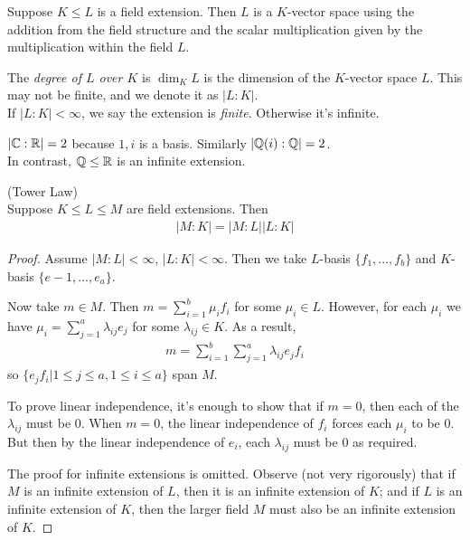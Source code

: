 \documentclass[a4paper]{article}
\begin{document}
Suppose $K \leq L$ is a field extension. Then $L$ is a $K$-vector space using the addition from the field structure and the scalar multiplication given by the multiplication within the field $L$.

\begin{defi}
The \emph{degree of $L$ over $K$} is $\dim_K L$ is the dimension of the $K$-vector space $L$. This may not be finite, and we denote it as $|L:K|$.\\
If $|L:K|<\infty$, we say the extension is \emph{finite}. Otherwise it's infinite.
\end{defi}

\begin{eg}
$|\mathbb{C}:\mathbb{R}| = 2$ because ${1,i}$ is a basis. Similarly $|\mathbb{Q}(i):\mathbb{Q}| = 2$.\\
In contrast, $\mathbb{Q}\leq\mathbb{R}$ is an infinite extension.
\end{eg}

\begin{thm} (Tower Law)\\
Suppose $K\leq L\leq M$ are field extensions. Then
\begin{equation*}
\begin{aligned}
|M:K| = |M:L| |L:K|
\end{aligned}
\end{equation*}
\begin{proof}
Assume $|M:L|<\infty$, $|L:K|<\infty$. Then we take $L$-basis $\{f_1,...,f_b\}$ and $K$-basis $\{e-1,...,e_a\}$.

Now take $m \in M$. Then $m= \sum_{i=1}^b \mu_i f_i$ for some $\mu_i \in L$. However, for each $\mu_i$ we have $\mu_i = \sum_{j=1}^a \lambda_{ij} e_j$ for some $\lambda_{ij} \in K$. As a result,
\begin{equation*}
\begin{aligned}
m=\sum_{i=1}^b \sum_{j=1}^a \lambda_{ij} e_j f_i
\end{aligned}
\end{equation*}
so $\{e_jf_i | 1\leq j\leq a, 1 \leq i \leq a\}$ span $M$.

To prove linear independence, it's enough to show that if $m=0$, then each of the $\lambda_{ij}$ must be 0. When $m=0$, the linear independence of $f_i$ forces each $\mu_i$ to be 0. But then by the linear independence of $e_i$, each $\lambda_{ij}$ must be 0 as required.

The proof for infinite extensions is omitted. Observe (not very rigorously) that if $M$ is an infinite extension of $L$, then it is an infinite extension of $K$; and if $L$ is an infinite extension of $K$, then the larger field $M$ must also be an infinite extension of $K$.
\end{proof}
\end{thm}
\end{document}
